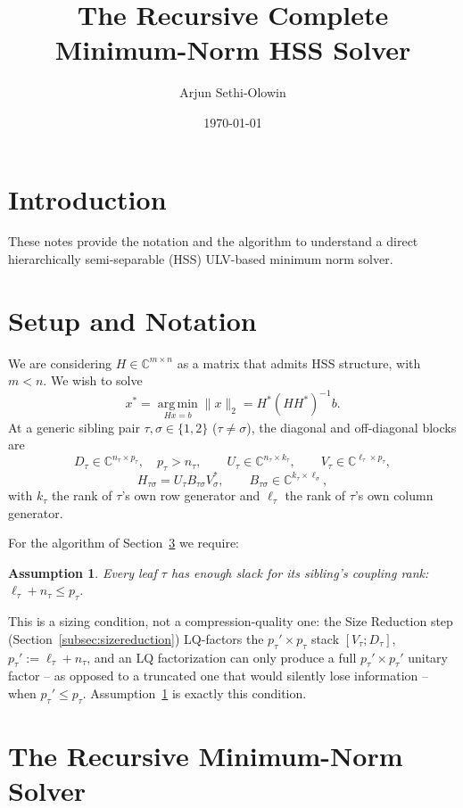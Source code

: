 \documentclass[11pt]{article}
\title{The Recursive Complete Minimum-Norm HSS Solver}
\author{Arjun Sethi-Olowin}
\date{\today}
\newtheorem{assumption}{Assumption}
\begin{document}
\maketitle

\section{Introduction}

These notes provide the notation and the algorithm to understand a direct
hierarchically semi-separable (HSS) ULV-based minimum norm solver.

\section{Setup and Notation}

We are considering $H\in\mathbb{C}^{m\times n}$ as a matrix that admits HSS
structure, with $m<n$. We wish to solve
\[
x^* = \operatorname*{arg\,min}_{Hx=b}\|x\|_2 = H^*(HH^*)^{-1}b.
\]
At a generic sibling pair $\tau,\sigma\in\{1,2\}$ ($\tau\neq\sigma$), the diagonal
and off-diagonal blocks are
\[
D_\tau\in\mathbb{C}^{n_\tau\times p_\tau},\quad p_\tau>n_\tau,\qquad
U_\tau\in\mathbb{C}^{n_\tau\times k_\tau},\qquad
V_\tau\in\mathbb{C}^{\ell_\tau\times p_\tau},
\]
\[
H_{\tau\sigma} = U_\tau B_{\tau\sigma}V_\sigma^*,\qquad B_{\tau\sigma}\in\mathbb{C}^{k_\tau\times\ell_\sigma},
\]
with $k_\tau$ the rank of $\tau$'s own row generator and $\ell_\tau$ the rank of
$\tau$'s own column generator.

For the algorithm of Section~\ref{sec:algorithm} we require:
\begin{assumption}
\label{as:slack}
Every leaf $\tau$ has enough slack for its sibling's coupling rank:
$\ell_\tau + n_\tau \le p_\tau$.
\end{assumption}
This is a sizing condition, not a compression-quality one: the Size Reduction
step (Section~\ref{subsec:sizereduction}) LQ-factors the $p_\tau'\times p_\tau$
stack $[V_\tau;D_\tau]$, $p_\tau':=\ell_\tau+n_\tau$, and an LQ factorization can
only produce a full $p_\tau'\times p_\tau'$ unitary factor -- as opposed to a
truncated one that would silently lose information -- when $p_\tau'\le p_\tau$.
Assumption~\ref{as:slack} is exactly this condition.

\section{The Recursive Minimum-Norm Solver}
\label{sec:algorithm}
\end{document}
